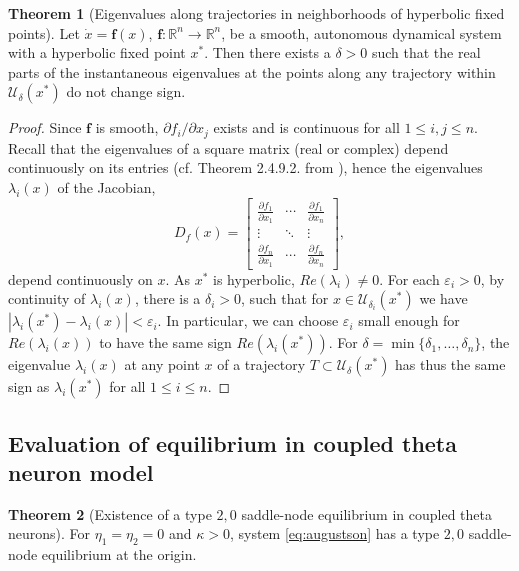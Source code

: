 \documentclass{article}
\theoremstyle{definition}
\newtheorem{theorem}{Theorem}[section]
\begin{document}
\begin{refsection}
\begin{theorem}[Eigenvalues along trajectories in neighborhoods of hyperbolic fixed points]
\label{theorem_vicinityHypFP}
Let $\dot{x} = \textbf{f}(x)$, $\textbf{f}:\mathbb{R}^n\to\mathbb{R}^n$, be a smooth, autonomous dynamical system with a hyperbolic fixed point $x^*$. Then there exists a $\delta>0$ such that the real parts of the instantaneous eigenvalues at the points along any trajectory within $\mathcal{U}_\delta(x^*)$ do not change sign.
\end{theorem}

\begin{proof} Since $\textbf{f}$ is smooth, $\partial f_i/ \partial x_j$ exists and is continuous for all $1\leq i,j\leq n$. Recall that the eigenvalues of a square matrix (real or complex) depend continuously on its entries (cf. Theorem 2.4.9.2. from \cite{HornJohnson2013}), hence the eigenvalues $\lambda_i(x)$ of the Jacobian, \[D_f(x)=  \begin{bmatrix}
\frac{\partial f_1}{\partial x_1} &  \cdots & \frac{\partial f_1}{\partial x_n} \\
\vdots & \ddots & \vdots \\
\frac{\partial f_n}{\partial x_1}& \cdots & \frac{\partial f_n}{\partial x_n}
\end{bmatrix},
\] depend continuously on $x$. As $x^*$ is hyperbolic, $Re(\lambda_i)\neq0$. For each $\varepsilon_i>0$, by continuity of $\lambda_i(x)$, there is a $\delta_i>0$, such that for $x \in \mathcal{U}_{\delta_i}(x^*)$ we have $|\lambda_i(x^*)-\lambda_i(x)|<\varepsilon_i$. In particular, we can choose $\varepsilon_i$ small enough for $Re(\lambda_i(x))$ to have the same sign $Re(\lambda_i(x^*))$. For $\delta=\min \{\delta_1, \dots, \delta_n\}$, the eigenvalue $\lambda_i(x)$ at any point $x$ of a trajectory $T\subset\mathcal{U}_\delta(x^*)$ has thus the same sign as $\lambda_i(x^*)$ for all $1\leq i \leq n$.
\end{proof}

\subsection{Evaluation of equilibrium in coupled theta neuron model}\label{subsec:theorem_jKSNinThetaNeurons}

\begin{theorem}[Existence of a type $2,0$ saddle-node equilibrium in coupled theta neurons] \label{theorem_jKSNinThetaNeurons}
For $\eta_1 = \eta_2  = 0$ and $\kappa >0$, system \ref{eq:augustson} has a type $2,0$ saddle-node equilibrium at the origin.
\end{theorem}


\end{refsection}
\end{document}
